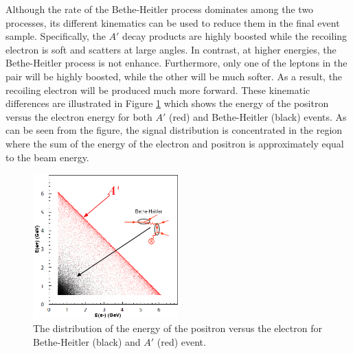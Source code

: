 Although the rate of the Bethe-Heitler process dominates among the two 
processes, its different kinematics can be used to reduce them in the final 
event sample.  Specifically, the $A'$ decay products are highly boosted while 
the recoiling electron is soft and scatters at large angles.  In contrast, 
at higher energies, the Bethe-Heitler process is not enhance.  Furthermore,
only one of the leptons in the pair will be highly boosted, while the other
will be much softer.  As a result, the recoiling electron will be produced much more forward.
These kinematic differences are illustrated in Figure \ref{fig:ap_v_bethe} which
shows the energy of the positron versus the electron energy for both $A'$ (red)
and Bethe-Heitler (black) events.  As can be seen from the figure, the signal
distribution is concentrated in the region where the sum of the energy of the
electron and positron is approximately equal to the beam energy.
\begin{figure}[b]
    \centering
    \includegraphics[width=0.5\textwidth]{images/bh_energy_cut.png}
    \caption{The distribution of the energy of the positron versus the electron
    for Bethe-Heitler (black) and $A'$ (red) event.}
    \label{fig:ap_v_bethe}
\end{figure}


